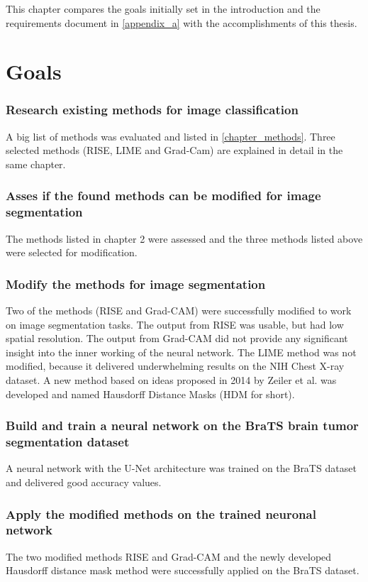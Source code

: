 This chapter compares the goals initially set in the introduction and the requirements document in \autoref{appendix_a}  with the accomplishments of this thesis.

\section{Goals}

\subsubsection{Research existing methods for image classification}
A big list of methods was evaluated and listed in \autoref{chapter_methods}. Three selected methods (RISE, LIME and Grad-Cam) are explained in detail in the same chapter.

\subsubsection{Asses if the found methods can be modified for image segmentation}
The methods listed in chapter 2 were assessed and the three methods listed above were selected for modification.

\subsubsection{Modify the methods for image segmentation}
Two of the methods (RISE and Grad-CAM) were successfully modified to work on image segmentation tasks. The output from RISE was usable, but had low spatial resolution. The output from Grad-CAM did not provide any significant insight into the inner working of the neural network.  The LIME method was not modified, because it delivered underwhelming results on the NIH Chest X-ray dataset. A new method based on ideas proposed in 2014 by Zeiler et al.\cite{zeiler2014visualizing} was developed and named Hausdorff Distance Masks (HDM for short).

\subsubsection{Build and train a neural network on the BraTS brain tumor segmentation dataset}
A neural network with the U-Net architecture was trained on the BraTS dataset and delivered good accuracy values.

\subsubsection{Apply the modified methods on the trained neuronal network}
The two modified methods RISE and Grad-CAM and the newly developed Hausdorff distance mask method were successfully applied on the BraTS dataset.

